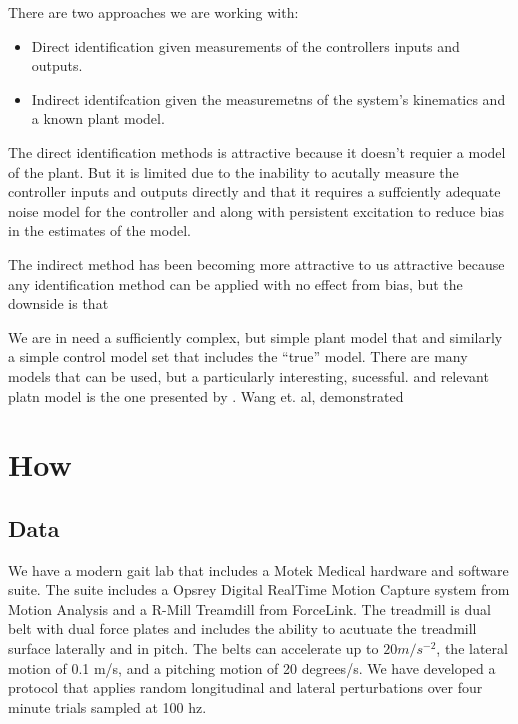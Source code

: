 \documentclass[11pt]{article}
\begin{document}
There are two approaches we are working with:

\begin{itemize}
  \item Direct identification given measurements of the controllers inputs and
    outputs.
  \item Indirect identifcation given the measuremetns of the system's
    kinematics and a known plant model.
\end{itemize}

The direct identification methods is attractive because it doesn't requier a
model of the plant. But it is limited due to the inability to acutally measure
the controller inputs and outputs directly and that it requires a suffciently
adequate noise model for the controller and along with persistent excitation to
reduce bias in the estimates of the model.

The indirect method has been becoming more attractive to us attractive because
any identification method can be applied with no effect from bias, but the
downside is that 

We are in need a sufficiently complex, but simple plant model that and
similarly a simple control model set that includes the ``true'' model. There
are many models that can be used, but a particularly interesting, sucessful.
and relevant platn model is the one presented by \cite{Wang2012}. Wang et. al,
demonstrated 

\section{How}

\subsection{Data}

We have a modern gait lab that includes a Motek Medical hardware and software
suite. The suite includes a Opsrey Digital RealTime Motion Capture system from
Motion Analysis and a R-Mill Treamdill from ForceLink. The treadmill is dual
belt with dual force plates and includes the ability to acutuate the treadmill
surface laterally and in pitch. The belts can accelerate up to $20 m/s^{-2}$,
the lateral motion of 0.1 m/s, and a pitching motion of 20 degrees/s. We have
developed a protocol that applies random longitudinal and lateral perturbations
over four minute trials sampled at 100 hz.

\end{document}
